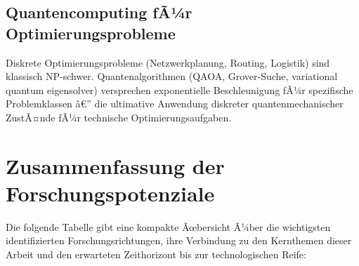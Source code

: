 ﻿\documentclass[12pt,a4paper,titlepage]{report}
\begin{document}
\subsection{Quantencomputing fÃ¼r Optimierungsprobleme}

Diskrete Optimierungsprobleme (Netzwerkplanung, Routing, Logistik) sind klassisch
NP-schwer. Quantenalgorithmen (QAOA, Grover-Suche, variational quantum eigensolver)
versprechen exponentielle Beschleunigung fÃ¼r spezifische Problemklassen â€” die
ultimative Anwendung diskreter quantenmechanischer ZustÃ¤nde fÃ¼r technische
Optimierungsaufgaben.

\section{Zusammenfassung der Forschungspotenziale}

Die folgende Tabelle gibt eine kompakte Ãœbersicht Ã¼ber die wichtigsten
identifizierten Forschungsrichtungen, ihre Verbindung zu den Kernthemen dieser
Arbeit und den erwarteten Zeithorizont bis zur technologischen Reife:
\end{document}
